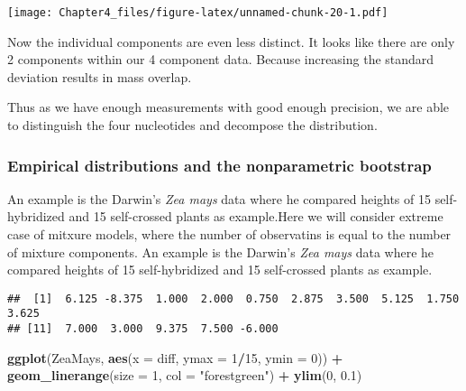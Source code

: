 \documentclass[]{article}
\newenvironment{Shaded}{\begin{snugshade}}{\end{snugshade}}
\newcommand{\DataTypeTok}[1]{\textcolor[rgb]{0.13,0.29,0.53}{#1}}
\newcommand{\DecValTok}[1]{\textcolor[rgb]{0.00,0.00,0.81}{#1}}
\newcommand{\FloatTok}[1]{\textcolor[rgb]{0.00,0.00,0.81}{#1}}
\newcommand{\KeywordTok}[1]{\textcolor[rgb]{0.13,0.29,0.53}{\textbf{#1}}}
\newcommand{\NormalTok}[1]{#1}
\newcommand{\OperatorTok}[1]{\textcolor[rgb]{0.81,0.36,0.00}{\textbf{#1}}}
\newcommand{\StringTok}[1]{\textcolor[rgb]{0.31,0.60,0.02}{#1}}
\begin{document}
\texttt{[image: Chapter4\_files/figure-latex/unnamed-chunk-20-1.pdf]}

Now the individual components are even less distinct. It looks like
there are only 2 components within our 4 component data. Because
increasing the standard deviation results in mass overlap.

Thus as we have enough measurements with good enough precision, we are
able to distinguish the four nucleotides and decompose the distribution.

\hypertarget{empirical-distributions-and-the-nonparametric-bootstrap}{%
\subsubsection{Empirical distributions and the nonparametric
bootstrap}\label{empirical-distributions-and-the-nonparametric-bootstrap}}

An example is the Darwin's \emph{Zea mays} data where he compared
heights of 15 self-hybridized and 15 self-crossed plants as example.Here
we will consider extreme case of mitxure models, where the number of
observatins is equal to the number of mixture components. An example is
the Darwin's \emph{Zea mays} data where he compared heights of 15
self-hybridized and 15 self-crossed plants as example.

\begin{Shaded}
\end{Shaded}

\begin{verbatim}
##  [1]  6.125 -8.375  1.000  2.000  0.750  2.875  3.500  5.125  1.750  3.625
## [11]  7.000  3.000  9.375  7.500 -6.000
\end{verbatim}

\begin{Shaded}
\begin{Highlighting}[]
\KeywordTok{ggplot}\NormalTok{(ZeaMays, }\KeywordTok{aes}\NormalTok{(}\DataTypeTok{x =}\NormalTok{ diff, }\DataTypeTok{ymax =} \DecValTok{1}\OperatorTok{/}\DecValTok{15}\NormalTok{, }\DataTypeTok{ymin =} \DecValTok{0}\NormalTok{)) }\OperatorTok{+}
\StringTok{  }\KeywordTok{geom_linerange}\NormalTok{(}\DataTypeTok{size =} \DecValTok{1}\NormalTok{, }\DataTypeTok{col =} \StringTok{"forestgreen"}\NormalTok{) }\OperatorTok{+}\StringTok{ }\KeywordTok{ylim}\NormalTok{(}\DecValTok{0}\NormalTok{, }\FloatTok{0.1}\NormalTok{)}
\end{Highlighting}
\end{Shaded}
\end{document}
